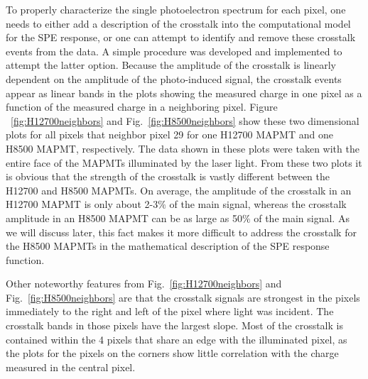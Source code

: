 To properly characterize the single photoelectron spectrum for each pixel, one needs to either add a description of the crosstalk into the computational model for the SPE response, or one can attempt to identify and remove these crosstalk events from the data. A simple procedure was developed and implemented to attempt the latter option. Because the amplitude of the crosstalk is linearly dependent on the amplitude of the photo-induced signal, the crosstalk events appear as linear bands in the plots showing the measured charge in one pixel as a function of the measured charge in a neighboring pixel. Figure ~\ref{fig:H12700neighbors} and Fig.~\ref{fig:H8500neighbors} show these two dimensional plots for all pixels that neighbor pixel 29 for one H12700 MAPMT and one H8500 MAPMT, respectively. The data shown in these plots were taken with the entire face of the MAPMTs illuminated by the laser light. From these two plots it is obvious that the strength of the crosstalk is vastly different between the H12700 and H8500 MAPMTs. On average, the amplitude of the crosstalk in an H12700 MAPMT is only about 2-3$\%$ of the main signal, whereas the crosstalk amplitude in an H8500 MAPMT can be as large as 50$\%$ of the main signal. As we will discuss later, this fact makes it more difficult to address the crosstalk for the H8500 MAPMTs in the mathematical description of the SPE response function.

Other noteworthy features from Fig.~\ref{fig:H12700neighbors} and Fig.~\ref{fig:H8500neighbors} are that the crosstalk signals are strongest in the pixels immediately to the right and left of the pixel where light was incident. The crosstalk bands in those pixels have the largest slope. Most of the crosstalk is contained within the 4 pixels that share an edge with the illuminated pixel, as the plots for the pixels on the corners show little correlation with the charge measured in the central pixel.

